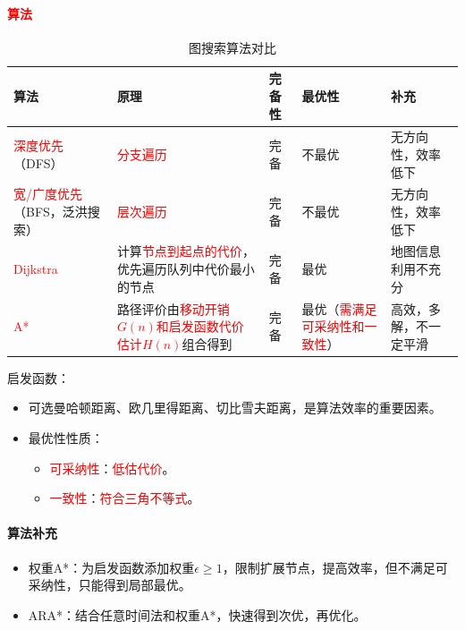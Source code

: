 \documentclass[
12pt, %
a4paper, 
oneside, %
]{scrartcl}
\begin{document}
\paragraph{\textcolor{red}{算法}}
\begin{table}[H]
\centering
\begin{tabular}{|p{2cm}|p{5.5cm}|p{1.4cm}|p{3.5cm}|p{2.5cm}|}
\hline
算法 & 原理 & 完备性 & 最优性 & 补充 \\
\hline
\textcolor{red}{深度优先}（DFS） & \textcolor{red}{分支遍历} & 完备 & 不最优 & 无方向性，效率低下 \\
\hline
\textcolor{red}{宽/广度优先}（BFS，泛洪搜索） & \textcolor{red}{层次遍历} & 完备 & 不最优 & 无方向性，效率低下 \\
\hline
\textcolor{red}{Dijkstra} & 计算\textcolor{red}{节点到起点的代价}，优先遍历队列中代价最小的节点 & 完备 & 最优 & 地图信息利用不充分 \\
\hline
\textcolor{red}{A*} & 路径评价由\textcolor{red}{移动开销$ G(n) $和启发函数代价估计$ H(n) $}组合得到 & 完备 & 最优（\textcolor{red}{需满足可采纳性和一致性}） & 高效，多解，不一定平滑 \\
\hline
\end{tabular}
\caption{图搜索算法对比}
\end{table}

启发函数：
\begin{itemize}
\item 可选曼哈顿距离、欧几里得距离、切比雪夫距离，是算法效率的重要因素。
\item 最优性性质：
\begin{itemize}
\item \textcolor{red}{可采纳性}：\textcolor{red}{低估代价}。
\item \textcolor{red}{一致性}：\textcolor{red}{符合三角不等式}。
\end{itemize}
\end{itemize}
\paragraph{算法补充}
\begin{itemize}
\item 权重A*：为启发函数添加权重$ \epsilon \geq 1 $，限制扩展节点，提高效率，但不满足可采纳性，只能得到局部最优。
\item ARA*：结合任意时间法和权重A*，快速得到次优，再优化。
\end{itemize}
\end{document}
